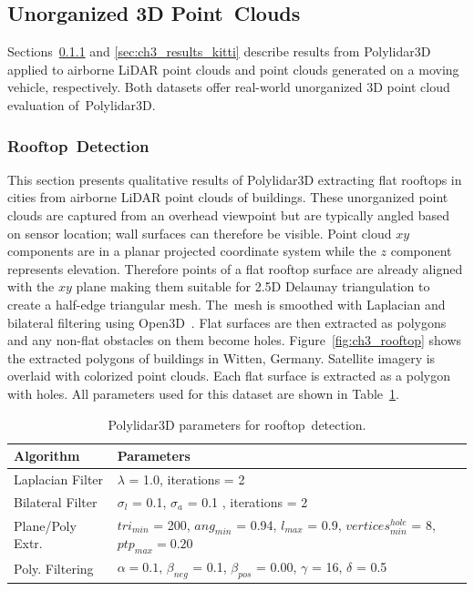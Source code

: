 \subsection{Unorganized 3D Point~Clouds}\label{sec:ch3_results_unorganized}

Sections~\ref{sec:ch3_results_rooftop} and \ref{sec:ch3_results_kitti} describe results from Polylidar3D applied to airborne LiDAR point clouds and point clouds generated on a moving vehicle, respectively.  Both datasets offer real-world unorganized 3D point cloud evaluation of~Polylidar3D.

\subsubsection{Rooftop~Detection} \label{sec:ch3_results_rooftop}


This section presents qualitative results of Polylidar3D extracting flat rooftops in cities from airborne LiDAR point clouds of buildings. These unorganized point clouds are captured from an overhead viewpoint but are typically angled based on sensor location; wall surfaces can therefore be visible. Point cloud $xy$ components are in a planar projected coordinate system while the $z$ component represents elevation. Therefore points of a flat rooftop surface are already aligned with the $xy$ plane making them suitable for 2.5D Delaunay triangulation to create a half-edge triangular mesh.  The~mesh is smoothed with Laplacian and bilateral filtering using Open3D~\cite{zhou_open3d_2018}. Flat surfaces are then extracted as polygons and any non-flat obstacles on them become holes. Figure~\ref{fig:ch3_rooftop} shows the extracted polygons of buildings in Witten, Germany. Satellite imagery is overlaid with colorized point clouds. %
Each flat surface is extracted as a polygon with holes. 
All parameters used for this dataset are shown in Table~\ref{table:ch3_rooftop_parameters}. 


\begin{table}[H]
\centering
\caption{Polylidar3D parameters for rooftop~detection.}\label{table:ch3_rooftop_parameters}
\begin{tabular}{@{}ll@{}}
\toprule
\textbf{Algorithm}        & \textbf{Parameters}                                                          \\ \midrule
Laplacian Filter & $\lambda$ = 1.0, iterations = 2   \\
Bilateral Filter & $\sigma_l$ = 0.1, $\sigma_a$ = 0.1 , iterations = 2 \\
Plane/Poly Extr.      & $tri_{min}$ = 200, $ang_{min}$ = 0.94, $l_{max}$ = 0.9, $vertices^{hole}_{min}$ = 8, $ptp_{max} = 0.20$     \\
Poly. Filtering      & $\alpha = 0.1$, $\beta_{neg}$ = 0.1, $\beta_{pos}$ = 0.00, $\gamma$ = 16, $\delta$ = 0.5  \\ \bottomrule
\end{tabular}
\end{table}


